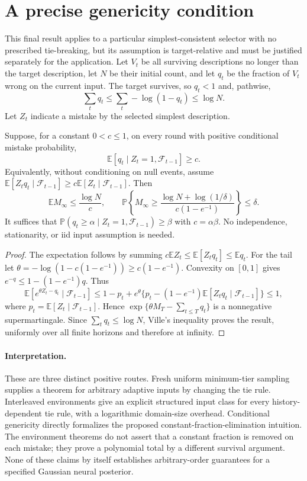 \section{A precise genericity condition}

This final result applies to a particular simplest-consistent selector
with no prescribed tie-breaking, but its assumption is target-relative
and must be justified separately for the application. Let $V_t$ be all
surviving descriptions no longer than the target description, let $N$ be
their initial count, and let $q_t$ be the fraction of $V_t$ wrong on the
current input. The target survives, so $q_t<1$ and, pathwise,
\[
 \sum_t q_t\le\sum_t-\log(1-q_t)\le\log N.
\]
Let $Z_t$ indicate a mistake by the selected simplest description.

\begin{theorem}\label{thm:genericity}
Suppose, for a constant $0<c\le1$, on every round with positive conditional
mistake probability,
\[
 \mathbb E[q_t\mid Z_t=1,\mathcal F_{t-1}]\ge c.
\]
Equivalently, without conditioning on null events, assume
$\mathbb E[Z_tq_t\mid\mathcal F_{t-1}]
 \ge c\mathbb E[Z_t\mid\mathcal F_{t-1}]$.
Then
\[
 \mathbb E M_\infty\le\frac{\log N}{c},\qquad
 \mathbb P\left\{M_\infty\ge
 \frac{\log N+\log(1/\delta)}{c(1-e^{-1})}\right\}\le\delta.
\]
It suffices that
$\mathbb P(q_t\ge\alpha\mid Z_t=1,\mathcal F_{t-1})\ge\beta$
with $c=\alpha\beta$. No independence, stationarity, or iid input
assumption is needed.
\end{theorem}

\begin{proof}
The expectation follows by summing
$c\mathbb E Z_t\le\mathbb E[Z_tq_t]\le\mathbb E q_t$.
For the tail let
$\theta=-\log(1-c(1-e^{-1}))\ge c(1-e^{-1})$.
Convexity on $[0,1]$ gives $e^{-q}\le1-(1-e^{-1})q$. Thus
\[
 \mathbb E[e^{\theta Z_t-q_t}\mid\mathcal F_{t-1}]
 \le1-p_t+e^\theta\{p_t-(1-e^{-1})\mathbb E[Z_tq_t\mid\mathcal F_{t-1}]\}
 \le1,
\]
where $p_t=\mathbb E[Z_t\mid\mathcal F_{t-1}]$.
Hence $\exp\{\theta M_T-\sum_{t\le T}q_t\}$ is a nonnegative
supermartingale. Since $\sum_tq_t\le\log N$, Ville's inequality proves
the result, uniformly over all finite horizons and therefore at infinity.
\end{proof}

\paragraph{Interpretation.}
These are three distinct positive routes. Fresh uniform minimum-tier
sampling supplies a theorem for arbitrary adaptive inputs by changing the
tie rule. Interleaved environments give an explicit structured input class
for every history-dependent tie rule, with a logarithmic domain-size
overhead. Conditional genericity directly formalizes the proposed
constant-fraction-elimination intuition. The environment theorems do not
assert that a constant fraction is removed on each mistake; they prove a
polynomial total by a different survival argument. None of these claims
by itself establishes arbitrary-order guarantees for a specified Gaussian
neural posterior.
